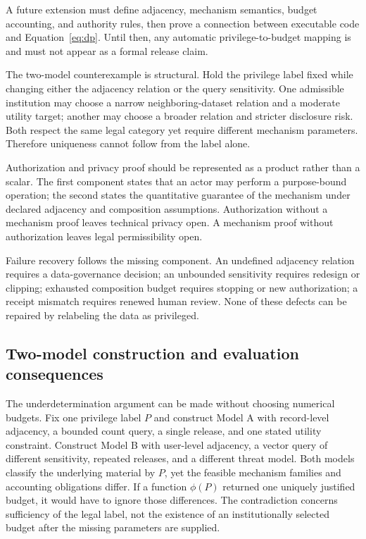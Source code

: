 A future extension must define adjacency, mechanism semantics, budget accounting, and authority rules, then prove a connection between executable code and Equation~\eqref{eq:dp}. Until then, any automatic privilege-to-budget mapping is \conjectured{} and must not appear as a formal release claim.

The two-model counterexample is structural. Hold the privilege label fixed while changing either the adjacency relation or the query sensitivity. One admissible institution may choose a narrow neighboring-dataset relation and a moderate utility target; another may choose a broader relation and stricter disclosure risk. Both respect the same legal category yet require different mechanism parameters. Therefore uniqueness cannot follow from the label alone.

Authorization and privacy proof should be represented as a product rather than a scalar. The first component states that an actor may perform a purpose-bound operation; the second states the quantitative guarantee of the mechanism under declared adjacency and composition assumptions. Authorization without a mechanism proof leaves technical privacy open. A mechanism proof without authorization leaves legal permissibility open.

Failure recovery follows the missing component. An undefined adjacency relation requires a data-governance decision; an unbounded sensitivity requires redesign or clipping; exhausted composition budget requires stopping or new authorization; a receipt mismatch requires renewed human review. None of these defects can be repaired by relabeling the data as privileged.

\subsection{Two-model construction and evaluation consequences}

The underdetermination argument can be made without choosing numerical budgets. Fix one privilege label $P$ and construct Model A with record-level adjacency, a bounded count query, a single release, and one stated utility constraint. Construct Model B with user-level adjacency, a vector query of different sensitivity, repeated releases, and a different threat model. Both models classify the underlying material by $P$, yet the feasible mechanism families and accounting obligations differ. If a function $\phi(P)$ returned one uniquely justified budget, it would have to ignore those differences. The contradiction concerns sufficiency of the legal label, not the existence of an institutionally selected budget after the missing parameters are supplied.

